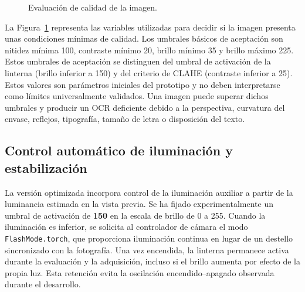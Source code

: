 \begin{figure}[htbp]
	\centering
	\caption{Evaluación de calidad de la imagen.}
	\label{fig:calidad-praeco}
\end{figure}

La Figura~\ref{fig:calidad-praeco} representa las variables utilizadas para decidir si la imagen presenta unas condiciones mínimas de calidad. Los umbrales básicos de aceptación son nitidez mínima 100, contraste mínimo 20, brillo mínimo 35 y brillo máximo 225. Estos umbrales de aceptación se distinguen del umbral de activación de la linterna (brillo inferior a 150) y del criterio de CLAHE (contraste inferior a 25). Estos valores son parámetros iniciales del prototipo y no deben interpretarse como límites universalmente validados. Una imagen puede superar dichos umbrales y producir un OCR deficiente debido a la perspectiva, curvatura del envase, reflejos, tipografía, tamaño de letra o disposición del texto.

\subsection{Control automático de iluminación y estabilización}

La versión optimizada incorpora control de la iluminación auxiliar a partir de la luminancia estimada en la vista previa. Se ha fijado experimentalmente un umbral de activación de \textbf{150} en la escala de brillo de 0 a 255. Cuando la iluminación es inferior, se solicita al controlador de cámara el modo \texttt{FlashMode.torch}, que proporciona iluminación continua en lugar de un destello sincronizado con la fotografía. Una vez encendida, la linterna permanece activa durante la evaluación y la adquisición, incluso si el brillo aumenta por efecto de la propia luz. Esta retención evita la oscilación encendido--apagado observada durante el desarrollo.

